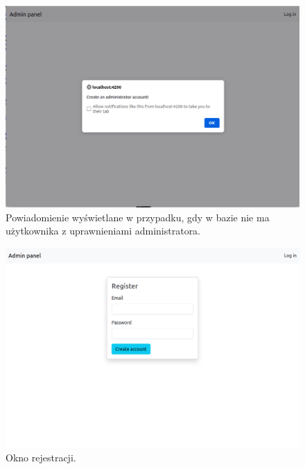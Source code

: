 \documentclass[a4paper,twoside,12pt]{book}
\begin{document}
\begin{figure}[]
\centering
\includegraphics[width=\textwidth]{adminpanel/alert}
\caption{Powiadomienie wyświetlane w przypadku, gdy w bazie nie ma użytkownika z uprawnieniami administratora.}
\label{fig:alert}
\end{figure}

\begin{figure}[]
\centering
\includegraphics[width=\textwidth]{adminpanel/register}
\caption{Okno rejestracji.}
\label{fig:register}
\end{figure}
\end{document}
